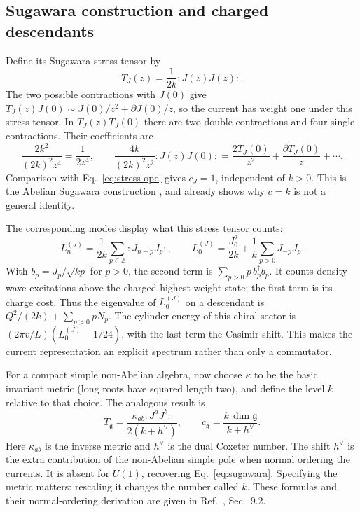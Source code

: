 \documentclass[aps,prb,onecolumn,nofootinbib,superscriptaddress]{revtex4-2}
\begin{document}
\subsection{Sugawara construction and charged descendants}
Define its Sugawara stress tensor by
\begin{equation}
 T_J(z)=\frac{1}{2k}:\!J(z)J(z)\!: .
 \label{eq:sugawara}
\end{equation}
The two possible contractions with $J(0)$ give
$T_J(z)J(0)\sim J(0)/z^2+\partial J(0)/z$, so the current has
weight one under this stress tensor. In $T_J(z)T_J(0)$ there are two
double contractions and four single contractions. Their coefficients are
\begin{equation}
 \frac{2k^2}{(2k)^2z^4}=\frac{1}{2z^4},\qquad
 \frac{4k}{(2k)^2z^2}:\!J(z)J(0)\!:
 =\frac{2T_J(0)}{z^2}+\frac{\partial T_J(0)}{z}+\cdots .
 \label{eq:sugawara-contractions}
\end{equation}
Comparison with Eq.~\eqref{eq:stress-ope} gives $c_J=1$, independent of
$k>0$. This is the Abelian Sugawara construction
\cite{DiFrancescoMathieuSenechal1997}, and already shows why $c=k$
is not a general identity.

The corresponding modes display what this stress tensor counts:
\begin{equation}
 L_n^{(J)}=\frac{1}{2k}\sum_{p\in\mathbb Z}:J_{n-p}J_p:,\qquad
 L_0^{(J)}=\frac{J_0^2}{2k}+\frac1k\sum_{p>0}J_{-p}J_p .
 \label{eq:sugawara-modes}
\end{equation}
With $b_p=J_p/\sqrt{kp}$ for $p>0$, the second term is
$\sum_{p>0}p\,b_p^\dagger b_p$. It counts density-wave excitations above
the charged highest-weight state; the first term is its charge cost.
Thus the eigenvalue of $L_0^{(J)}$ on a descendant is
$Q^2/(2k)+\sum_{p>0}pN_p$. The cylinder energy of this chiral sector is
$(2\pi v/L)(L_0^{(J)}-1/24)$, with the last term the Casimir shift.
This makes the current representation an explicit spectrum rather than
only a commutator.

For a compact simple non-Abelian algebra, now choose $\kappa$ to be the
basic invariant metric (long roots have squared length two), and define
the level $k$ relative to that choice. The analogous result is
\begin{equation}
 T_{\mathfrak g}
   =\frac{\kappa_{ab}:J^aJ^b:}{2(k+h^\vee)},\qquad
 c_{\mathfrak g}=\frac{k\,\dim\mathfrak g}{k+h^\vee}.
 \label{eq:nonabelian-sugawara}
\end{equation}
Here $\kappa_{ab}$ is the inverse metric and $h^\vee$ is the dual Coxeter
number. The shift
$h^\vee$ is the extra contribution of the non-Abelian simple pole when
normal ordering the currents. It is absent for $U(1)$, recovering
Eq.~\eqref{eq:sugawara}. Specifying the metric matters: rescaling it
changes the number called $k$. These formulas and their normal-ordering
derivation are given in Ref.~\cite{Ginsparg1989}, Sec.~9.2.
\end{document}

